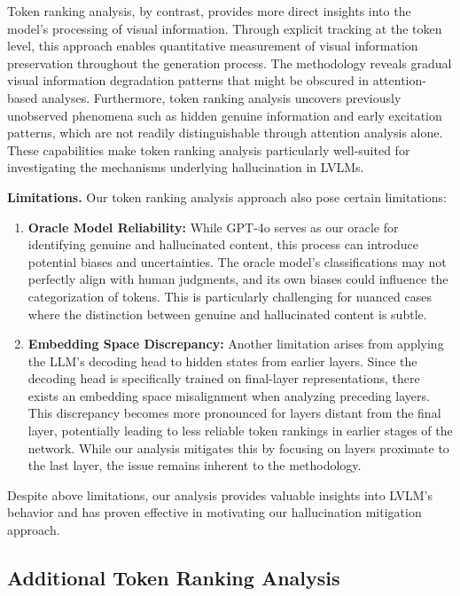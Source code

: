 \documentclass{article}
\theoremstyle{plain}
\theoremstyle{definition}
\theoremstyle{remark}
\begin{document}
Token ranking analysis, by contrast, provides more direct insights into the model's processing of visual information. Through explicit tracking at the token level, this approach enables quantitative measurement of visual information preservation throughout the generation process. The methodology reveals gradual visual information degradation patterns that might be obscured in attention-based analyses. Furthermore, token ranking analysis uncovers previously unobserved phenomena such as hidden genuine information and early excitation patterns, which are not readily distinguishable through attention analysis alone. These capabilities make token ranking analysis particularly well-suited for investigating the mechanisms underlying hallucination in LVLMs.

\noindent\textbf{Limitations.} Our token ranking analysis approach also pose certain limitations:

\begin{enumerate}
    \item \textbf{Oracle Model Reliability:} While GPT-4o serves as our oracle for identifying genuine and hallucinated content, this process can introduce potential biases and uncertainties. The oracle model's classifications may not perfectly align with human judgments, and its own biases could influence the categorization of tokens. This is particularly challenging for nuanced cases where the distinction between genuine and hallucinated content is subtle.
    
    \item \textbf{Embedding Space Discrepancy:} Another limitation arises from applying the LLM's decoding head to hidden states from earlier layers. Since the decoding head is specifically trained on final-layer representations, there exists an embedding space misalignment when analyzing preceding layers. This discrepancy becomes more pronounced for layers distant from the final layer, potentially leading to less reliable token rankings in earlier stages of the network. While our analysis mitigates this by focusing on layers proximate to the last layer, the issue remains inherent to the methodology.
\end{enumerate}

Despite above limitations, our analysis provides valuable insights into LVLM's behavior and has proven effective in motivating our hallucination mitigation approach.

\subsection{Additional Token Ranking Analysis}\label{appendix:extra_token_visual}
\end{document}
